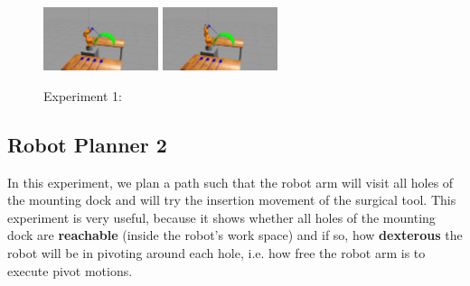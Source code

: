 \begin{center}
\begin{figure}[H]
\includegraphics[width=0.3\textwidth]{images/robot_planner1/robot_planner1_8}
\includegraphics[width=0.3\textwidth]{images/robot_planner1/robot_planner1_9}\\
\caption{Experiment 1:}
\end{figure}
\end{center}


\subsection{Robot Planner 2}

In this experiment, we plan a path such that the robot arm will visit all holes of the mounting dock and will try the insertion movement of the surgical tool.
This experiment is very useful, because it shows whether all holes of the mounting dock are \textbf{reachable} (inside the robot's work space) and if so, how 
\textbf{dexterous} the robot will be in pivoting around each hole, i.e. how free the robot arm is to execute pivot motions.

